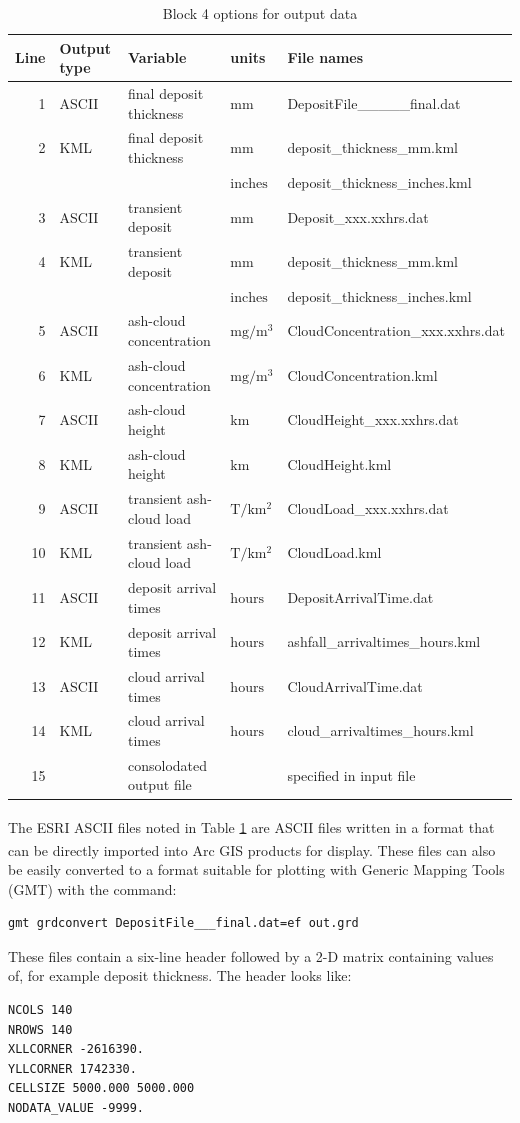 \begin{table}[htbp]
\begin{center}
\begin{tabular}{|r|l|l|l|l|}
\hline
Line & Output type&Variable&units & File names\\
\hline
 1&ASCII &final deposit thickness&$\mathrm{mm}$&DepositFile\_\_\_\_\_final.dat\\
 2&KML&final deposit thickness&$\mathrm{mm}$&deposit\_thickness\_mm.kml\\
  & & &$\mathrm{inches}$&deposit\_thickness\_inches.kml\\
 3&ASCII &transient deposit&$\mathrm{mm}$&Deposit\_xxx.xxhrs.dat\\
 4&KML&transient deposit&$\mathrm{mm}$&deposit\_thickness\_mm.kml\\
  & & &$\mathrm{inches}$&deposit\_thickness\_inches.kml\\
 5&ASCII &ash-cloud concentration&$\mathrm{mg/m^3}$&CloudConcentration\_xxx.xxhrs.dat\\
 6&KML& ash-cloud concentration&$\mathrm{mg/m^3}$&CloudConcentration.kml\\
 7&ASCII&ash-cloud height&$\mathrm{km}$&CloudHeight\_xxx.xxhrs.dat\\
 8&KML&ash-cloud height&$\mathrm{km}$&CloudHeight.kml\\
 9&ASCII&transient ash-cloud load&$\mathrm{T/km^2}$&CloudLoad\_xxx.xxhrs.dat\\
10&KML&transient ash-cloud load&$\mathrm{T/km^2}$&CloudLoad.kml\\
11&ASCII&deposit arrival times&$\mathrm{hours}$&DepositArrivalTime.dat\\
12&KML&deposit arrival times&$\mathrm{hours}$&ashfall\_arrivaltimes\_hours.kml\\
13&ASCII&cloud arrival times&$\mathrm{hours}$&CloudArrivalTime.dat\\
14&KML&cloud arrival times&$\mathrm{hours}$&cloud\_arrivaltimes\_hours.kml\\
15&&consolodated output file&&specified in input file\\
\hline
\end{tabular}
\caption{\label{tab:OutputOptions}Block 4 options for output data}
\end{center}
\end{table}
\normalsize
The ESRI\textsuperscript{\tiny\textregistered} ASCII files noted in Table \ref{tab:OutputOptions}
are ASCII files written in a format that
can be directly imported into Arc\textsuperscript{\tiny\textregistered}
GIS products for display.
These files can also be easily converted to a format suitable for plotting with
Generic Mapping Tools (GMT) with the command:
\begin{verbatim}
gmt grdconvert DepositFile___final.dat=ef out.grd
\end{verbatim}
These files contain a six-line
header followed by a 2-D matrix containing values of, for example deposit thickness.
The header looks like:
\small
\begin{verbatim}
NCOLS 140
NROWS 140
XLLCORNER -2616390.
YLLCORNER 1742330.
CELLSIZE 5000.000 5000.000
NODATA_VALUE -9999.
\end{verbatim}
\normalsize

